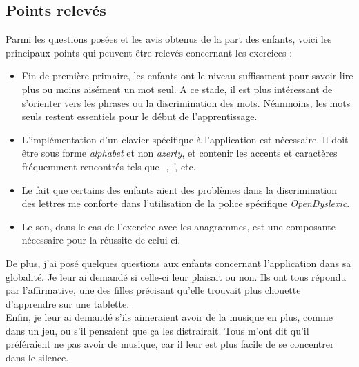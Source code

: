 \subsection{Points relevés \label{testPoints}}
Parmi les questions posées et les avis obtenus de la part des enfants, voici les principaux points qui peuvent être relevés concernant les exercices :
\begin{itemize}
\item Fin de première primaire, les enfants ont le niveau suffisament pour savoir lire plus ou moins aisément un mot seul. A ce stade, il est plus intéressant de s'orienter vers les phrases ou la discrimination des mots. Néanmoins, les mots seuls restent essentiels pour le début de l'apprentissage.
\item L'implémentation d'un clavier spécifique à l'application est nécessaire. Il doit être sous forme \textit{alphabet} et non \textit{azerty}, et contenir les accents et caractères fréquemment rencontrés tels que \textit{-}, \textit{'}, etc.
\item Le fait que certains des enfants aient des problèmes dans la discrimination des lettres me conforte dans l'utilisation de la police spécifique \textit{OpenDyslexic}.
\item Le son, dans le cas de l'exercice avec les anagrammes, est une composante nécessaire pour la réussite de celui-ci.\\
\end{itemize}

De plus, j'ai posé quelques questions aux enfants concernant l'application dans sa globalité. Je leur ai demandé si celle-ci leur plaisait ou non. Ils ont tous répondu par l'affirmative, une des filles précisant qu'elle trouvait plus chouette d'apprendre sur une tablette.\\
Enfin, je leur ai demandé s'ils aimeraient avoir de la musique en plus, comme dans un jeu, ou s'il pensaient que ça les distrairait. Tous m'ont dit qu'il préféraient ne pas avoir de musique, car il leur est plus facile de se concentrer dans le silence.